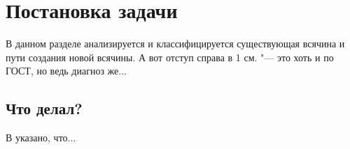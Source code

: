 \chapter{Постановка задачи}
\label{cha:analysis}
%
%
В данном разделе анализируется и классифицируется существующая всячина и пути создания новой всячины. А вот отступ справа в 1 см. "--- это хоть и по ГОСТ, но ведь диагноз же...

\section{Что делал?}


В \cite{Pup09} указано, что...


